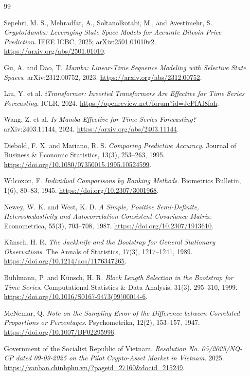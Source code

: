 \documentclass[13pt,a4paper,oneside]{report}
\begin{document}
\begin{thebibliography}{99}

Sepehri, M. S., Mehradfar, A., Soltanolkotabi, M., and Avestimehr, S.
\textit{CryptoMamba: Leveraging State Space Models for Accurate Bitcoin Price Prediction}.
IEEE ICBC, 2025; arXiv:2501.01010v2. \url{https://arxiv.org/abs/2501.01010}.

Gu, A. and Dao, T. \textit{Mamba: Linear-Time Sequence Modeling with Selective State Spaces}.
arXiv:2312.00752, 2023. \url{https://arxiv.org/abs/2312.00752}.

Liu, Y. et al. \textit{iTransformer: Inverted Transformers Are Effective for Time Series
Forecasting}. ICLR, 2024. \url{https://openreview.net/forum?id=JePfAI8fah}.

Wang, Z. et al. \textit{Is Mamba Effective for Time Series Forecasting?}
arXiv:2403.11144, 2024. \url{https://arxiv.org/abs/2403.11144}.

Diebold, F. X. and Mariano, R. S. \textit{Comparing Predictive Accuracy}.
Journal of Business \& Economic Statistics, 13(3), 253--263, 1995.
\url{https://doi.org/10.1080/07350015.1995.10524599}.

Wilcoxon, F. \textit{Individual Comparisons by Ranking Methods}.
Biometrics Bulletin, 1(6), 80--83, 1945. \url{https://doi.org/10.2307/3001968}.

Newey, W. K. and West, K. D. \textit{A Simple, Positive Semi-Definite, Heteroskedasticity and
Autocorrelation Consistent Covariance Matrix}. Econometrica, 55(3), 703--708, 1987.
\url{https://doi.org/10.2307/1913610}.

Künsch, H. R. \textit{The Jackknife and the Bootstrap for General Stationary Observations}.
The Annals of Statistics, 17(3), 1217--1241, 1989.
\url{https://doi.org/10.1214/aos/1176347265}.

Bühlmann, P. and Künsch, H. R. \textit{Block Length Selection in the Bootstrap for Time Series}.
Computational Statistics \& Data Analysis, 31(3), 295--310, 1999.
\url{https://doi.org/10.1016/S0167-9473(99)00014-6}.

McNemar, Q. \textit{Note on the Sampling Error of the Difference between Correlated Proportions or
Percentages}. Psychometrika, 12(2), 153--157, 1947.
\url{https://doi.org/10.1007/BF02295996}.

Government of the Socialist Republic of Vietnam. \textit{Resolution No. 05/2025/NQ-CP dated
09-09-2025 on the Pilot Crypto-Asset Market in Vietnam}. 2025.
\url{https://vanban.chinhphu.vn/?pageid=27160&docid=215249}.
\end{thebibliography}
\end{document}

